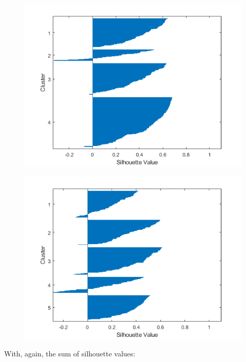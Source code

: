 \documentclass[sn-mathphys,Numbered]{sn-jnl}
\begin{document}
\begin{figure}[H]
\centering
\begin{minipage}{.5\textwidth}
  \centering
  \includegraphics[width=\linewidth]{silhouette_medians_4}
  \label{fig:test1}
\end{minipage}%
\begin{minipage}{.5\textwidth}
  \centering
  \includegraphics[width=\linewidth]{silhouette_medians_5}
  \label{fig:test2}
\end{minipage}
\end{figure}

With, again, the sum of silhouette values:
\end{document}
